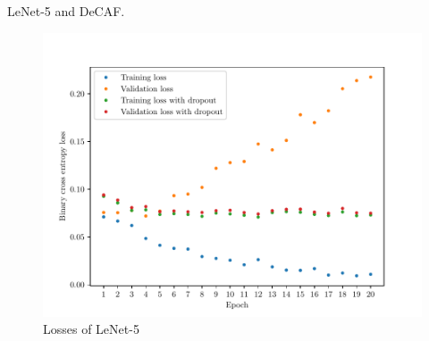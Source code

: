 LeNet-5 and DeCAF.

\begin{figure}
	\includegraphics[width=\textwidth]{img/lenet_losses.pdf}
	\caption{Losses of LeNet-5}
	\label{lenet_losses}
\end{figure}

